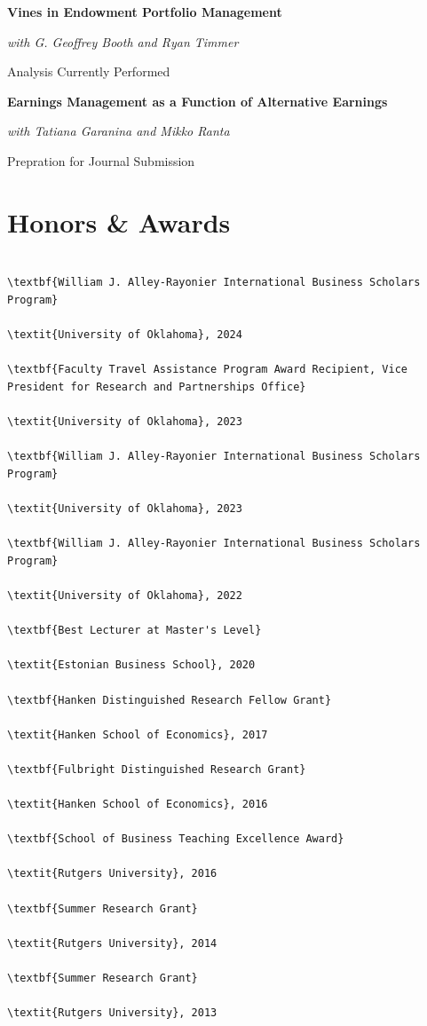 \documentclass[11pt,a4paper,]{awesome-cv}
\begin{document}
\textbf{Vines in Endowment Portfolio Management}

\textit{with G. Geoffrey Booth and Ryan Timmer}

Analysis Currently Performed

\textbf{Earnings Management as a Function of Alternative Earnings}

\textit{with Tatiana Garanina and Mikko Ranta}

Prepration for Journal Submission

\section{Honors \& Awards}\label{honors-awards}

\begin{verbatim}

\textbf{William J. Alley-Rayonier International Business Scholars Program}

\textit{University of Oklahoma}, 2024

\textbf{Faculty Travel Assistance Program Award Recipient, Vice President for Research and Partnerships Office}

\textit{University of Oklahoma}, 2023

\textbf{William J. Alley-Rayonier International Business Scholars Program}

\textit{University of Oklahoma}, 2023

\textbf{William J. Alley-Rayonier International Business Scholars Program}

\textit{University of Oklahoma}, 2022

\textbf{Best Lecturer at Master's Level}

\textit{Estonian Business School}, 2020

\textbf{Hanken Distinguished Research Fellow Grant}

\textit{Hanken School of Economics}, 2017

\textbf{Fulbright Distinguished Research Grant}

\textit{Hanken School of Economics}, 2016

\textbf{School of Business Teaching Excellence Award}

\textit{Rutgers University}, 2016

\textbf{Summer Research Grant}

\textit{Rutgers University}, 2014

\textbf{Summer Research Grant}

\textit{Rutgers University}, 2013


\end{verbatim}
\end{document}

